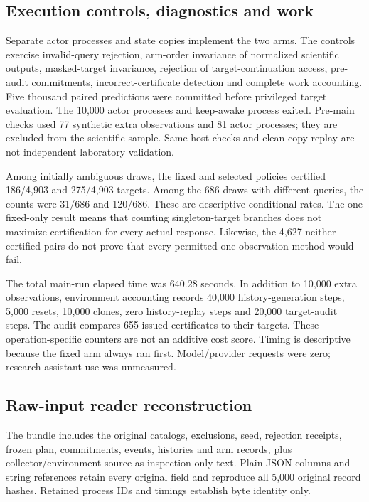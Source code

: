 \subsection{Execution controls, diagnostics and work}

Separate actor processes and state copies implement the two arms.
The controls exercise invalid-query rejection, arm-order invariance
of normalized scientific outputs, masked-target invariance, rejection
of target-continuation access, pre-audit commitments, incorrect-certificate
detection and complete work accounting. Five thousand paired predictions
were committed before privileged target evaluation. The 10,000 actor
processes and keep-awake process exited. Pre-main checks used 77
synthetic extra observations and 81 actor processes; they are excluded
from the scientific sample. Same-host checks and clean-copy replay are
not independent laboratory validation.

Among initially ambiguous draws, the fixed and selected policies
certified 186/4,903 and 275/4,903 targets. Among the 686 draws with
different queries, the counts were 31/686 and 120/686. These are
descriptive conditional rates. The one fixed-only result means that
counting singleton-target branches does not maximize certification for
every actual response. Likewise, the 4,627 neither-certified pairs
do not prove that every permitted one-observation method would fail.



The total main-run elapsed time was 640.28 seconds. In addition to
10,000 extra observations, environment accounting records 40,000
history-generation steps, 5,000 resets, 10,000 clones, zero history-replay
steps and 20,000 target-audit steps. The audit compares 655 issued
certificates to their targets. These operation-specific counters are
not an additive cost score. Timing is descriptive because the fixed arm
always ran first. Model/provider requests were zero; research-assistant
use was unmeasured.


\subsection{Raw-input reader reconstruction}
The bundle includes the original catalogs, exclusions, seed, rejection
receipts, frozen plan, commitments, events, histories and arm records,
plus collector/environment source as inspection-only text. Plain JSON
columns and string references retain every original field and reproduce
all 5,000 original record hashes. Retained process IDs and timings establish byte identity only.

